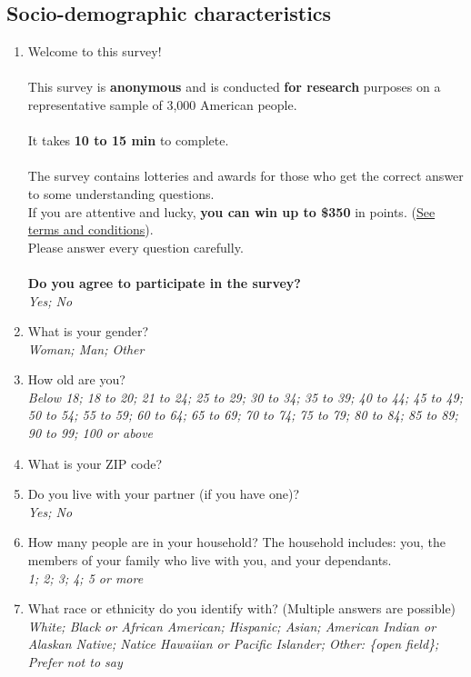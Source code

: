 \subsection*{Socio-demographic characteristics}
\begin{enumerate}[resume] 
\item Welcome to this survey!\\
\\
This survey is \textbf{anonymous} and is conducted \textbf{for research} purposes on a representative sample of 3,000 American people.\\
 \\
It takes \textbf{10 to 15 min} to complete.  \\
 \\
The survey contains lotteries and awards for those who get the correct answer to some understanding questions.\\
If you are attentive and lucky, \textbf{you can win up to \$350} in points. (\href{https://uvafeb.eu.qualtrics.com/WRQualtricsControlPanel/File.php?F=F_cBZAXTgNktGZbee&download=1}{See terms and conditions}).    \\
Please answer every question carefully.  \\
 \\
\textbf{Do you agree to participate in the survey?}
\\ \textit{Yes; No}
\item What is your gender?
\\ \textit{Woman; Man; Other}
\item How old are you?
\\ \textit{Below 18; 18 to 20; 21 to 24; 25 to 29; 30 to 34; 35 to 39; 40 to 44; 45 to 49; 50 to 54; 55 to 59; 60 to 64; 65 to 69; 70 to 74; 75 to 79; 80 to 84; 85 to 89; 90 to 99; 100 or above}
\item What is your ZIP code?%
\item Do you live with your partner (if you have one)?
\\ \textit{Yes; No}
\item How many people are in your household? The household includes: you, the members of your family who live with you, and your dependants. %
\\ \textit{1; 2; 3; 4; 5 or more}
\item What race or ethnicity do you identify with? (Multiple answers are possible) 
\\ \textit{White; Black or African American; Hispanic; Asian; American Indian or Alaskan Native; Natice Hawaiian or Pacific Islander; Other: \{open field\}; Prefer not to say}

\end{enumerate}
